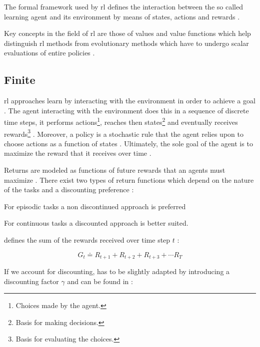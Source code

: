 The formal framework used by \gls{rl} defines the interaction between the so called learning agent and its environment by means of states, actions and rewards \citep[p. 15]{Sutton2017}.

Key concepts in the field of \gls{rl} are those of values and value functions which help distinguish \gls{rl} methods from evolutionary methods which have to undergo scalar evaluations of entire policies \citep[p. 15]{Sutton2017}.

\subsection{Finite }

\gls{rl} approaches learn by interacting with the environment in order to achieve a goal \citep{Sutton2017}. The agent interacting with the environment does this in a sequence of discrete time steps, it performs actions\footnote{Choices made by the agent.}, reaches then states\footnote{Basis for making decisions.} and eventually receives rewards\footnote{Basis for evaluating the choices.} \citep[p. 73]{Sutton2017}. Moreover, a policy is a stochastic rule that the agent relies upon to choose actions as a function of states \citep[p. 73]{Sutton2017}. Ultimately, the sole goal of the agent is to maximize the reward that it receives over time \citep[p. 73]{Sutton2017}.

Returns are modeled as functions of future rewards that an agents must maximize \citep[p. 73]{Sutton2017}. There exist two types of return functions which depend on the nature of the tasks and a discounting preference \citep[p. 73]{Sutton2017}:
\begin{enumerate*}
	\item For episodic tasks a non discontinued approach is preferred
	\item For continuous tasks a discounted approach is better suited.
\end{enumerate*}

 defines the sum of the rewards received over time step $t$ \citep[p. 73]{Sutton2017}:

\begin{equation}
\label{eq:expected_return}
	G_t  \doteq R_{t+1} + R_{t+2} + R_{t+3} + \cdots R_{T}
\end{equation}

If we account for discounting,  has to be slightly adapted by introducing a discounting factor $\gamma$ and can be found in :

